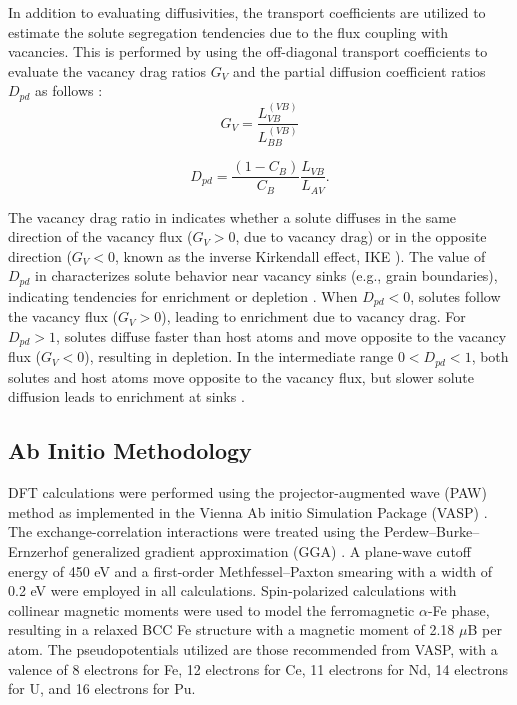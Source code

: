 \documentclass[preprint,12pt]{elsarticle}
\begin{document}
In addition to evaluating diffusivities, the transport coefficients are utilized to estimate the solute segregation tendencies due to the flux coupling with vacancies. This is performed by using the off-diagonal transport coefficients to evaluate the vacancy drag ratios $G_V$ and the partial diffusion coefficient ratios $D_{pd}$ as follows \cite{messina_exact_2014, messina_solute_2020}:
\begin{equation}
\label{eq:drag}
    G_V = \frac{L_{VB}^{(VB)}}{L_{BB}^{(VB)}}
\end{equation}

\begin{equation}
\label{eq:pdc}
D_{pd} = \frac{(1-C_B)}{C_B} \frac{L_{VB}}{L_{AV}}.
\end{equation}

\noindent The vacancy drag ratio in  indicates whether a solute diffuses in the same direction of the vacancy flux  ($G_V > 0$, due to vacancy drag) or in the opposite direction ($G_V < 0$, known as the inverse Kirkendall effect, IKE \citep{marwick_segregation_1978}). The value of \( D_{pd} \) in  characterizes solute behavior near vacancy sinks (e.g., grain boundaries), indicating tendencies for enrichment or depletion \citep{messina_exact_2014}. When \( D_{pd} < 0 \), solutes follow the vacancy flux (\( G_V > 0 \)), leading to enrichment due to vacancy drag. For \( D_{pd} > 1 \), solutes diffuse faster than host atoms and move opposite to the vacancy flux (\( G_V < 0 \)), resulting in depletion. In the intermediate range \( 0 < D_{pd} < 1 \), both solutes and host atoms move opposite to the vacancy flux, but slower solute diffusion leads to enrichment at sinks \cite{messina_exact_2014}.

\FloatBarrier
\subsection{Ab Initio Methodology}

\noindent DFT calculations were performed using the projector-augmented wave (PAW) method as implemented in the Vienna Ab initio Simulation Package (VASP) \cite{kresse_ab_1993, kresse_efficient_1996}. The exchange-correlation interactions were treated using the Perdew--Burke--Ernzerhof generalized gradient approximation (GGA) \cite{perdew_generalized_1996}. A plane-wave cutoff energy of 450 eV and a first-order Methfessel--Paxton smearing with a width of 0.2 eV were employed \cite{methfessel_high-precision_1989} in all calculations. Spin-polarized calculations with collinear magnetic moments were used to model the ferromagnetic $\alpha$-Fe phase, resulting in a relaxed BCC Fe structure with a magnetic moment of 2.18 $\mu$B per atom. The pseudopotentials utilized are those recommended from VASP, with a valence of 8 electrons for Fe, 12 electrons for Ce, 11 electrons for Nd, 14 electrons for U, and 16 electrons for Pu. 
\end{document}
